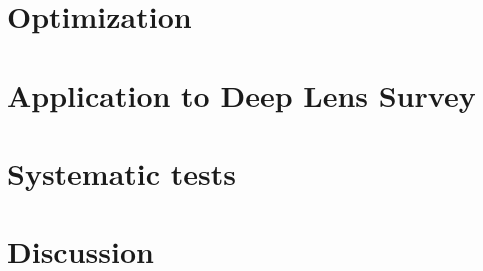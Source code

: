 \documentclass[12pt, preprint]{aastex}
\begin{document}
\section{Optimization}\label{sec:opt}



\section{Application to Deep Lens Survey}\label{sec:data}
\section{Systematic tests}\label{sec:sys}
\section{Discussion}\label{sec:discussion} 
\end{document}
